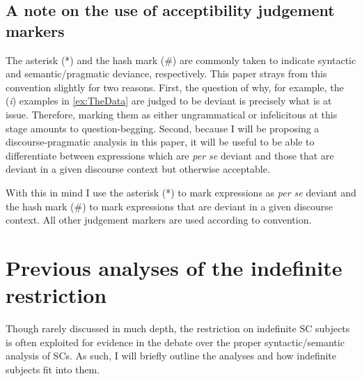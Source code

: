 \documentclass[
	letterpaper,
]{article}
\begin{document}
\subsection{A note on the use of acceptibility judgement markers}
The asterisk (*) and the hash mark (\#) are commonly taken to indicate syntactic and semantic/pragmatic deviance, respectively.
This paper strays from this convention slightly for two reasons.
First, the question of why, for example, the (\textit{i}) examples in \ref{ex:TheData} are judged to be deviant is precisely what is at issue.
Therefore, marking them as either ungrammatical or infelicitous at this stage amounts to question-begging.
Second, because I will be proposing a discourse-pragmatic analysis in this paper, it will be useful to be able to differentiate between expressions which are \textit{per se} deviant and those that are deviant in a given discourse context but otherwise acceptable.

With this in mind I use the asterisk (*) to mark expressions as \textit{per se} deviant and the hash mark (\#) to mark expressions that are deviant in a given discourse context. 
All other judgement markers are used according to convention.

\section{Previous analyses of the indefinite restriction}\label{sec:LitReview}
Though rarely discussed in much depth, the  restriction on indefinite SC subjects is often exploited for evidence in the debate over the proper syntactic/semantic analysis of SCs.
As such, I will briefly outline the analyses and how indefinite subjects fit into them.
\end{document}
